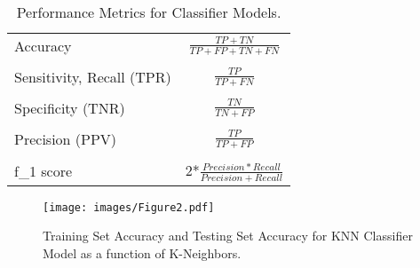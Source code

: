 \documentclass[sigconf]{acmart}
\begin{document}

\begin{table}
  \caption{Performance Metrics for Classifier Models.}
  \label{tab:freq}
  \begin{tabular}{lc}
    \toprule
    Accuracy & \(\frac{TP+TN}{TP+FP+TN+FN}\) \\
    & \\
    Sensitivity, Recall (TPR) &  \(\frac{TP}{TP+FN}\) \\
    & \\
    Specificity (TNR) &  \(\frac{TN}{TN+FP}\) \\
    & \\
    Precision (PPV) & \(\frac{TP}{TP+FP}\)  \\
    & \\
    f_1 score & 2*\(\frac{Precision*Recall}{Precision+Recall}\)
    & \\
    \bottomrule
  \end{tabular}
\end{table}


\begin{figure}[!ht]
  \centering\texttt{[image: images/Figure2.pdf]}
  \caption{Training Set Accuracy and Testing Set Accuracy for KNN Classifier
  Model as a function of K-Neighbors.}
  \label{f:Figure2}
\end{figure}

\end{document}

